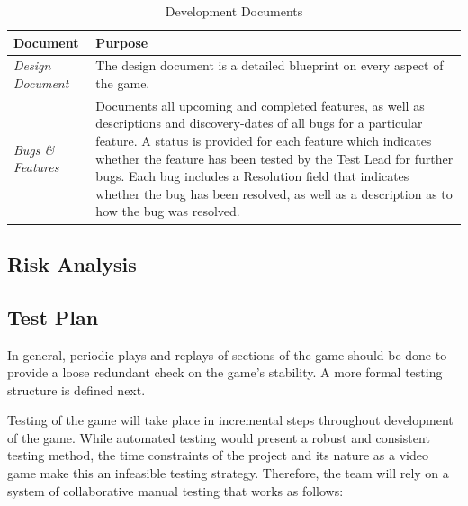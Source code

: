 \documentclass[12pt,titlepage]{article}
\begin{document}
\begin{table}[H]
\centering
\caption{Development Documents}
\label{tab:dev_docs}
\begin{tabularx}{\linewidth}{|l|X|}
\hline
{\bf Document}         & {\bf Purpose} \\ \hline
{\it Design Document}  & The design document is a detailed blueprint on every
                         aspect of the game. \\ \hline
{\it Bugs \& Features} & Documents all upcoming and completed features, as well
                         as descriptions and discovery-dates of all bugs for a
                         particular feature. A status is provided for each
                         feature which indicates whether the feature has been
                         tested by the Test Lead for further bugs. Each bug
                         includes a Resolution field that indicates whether the
                         bug has been resolved, as well as a description as to
                         how the bug was resolved. \\ \hline
\end{tabularx}
\end{table}


\subsection{Risk Analysis}

\subsection{Test Plan}

In general, periodic plays and replays of sections of the game should be done to
provide a loose redundant check on the game's stability. A more formal testing
structure is defined next.

Testing of the game will take place in incremental steps throughout development
of the game. While automated testing would present a robust and consistent
testing method, the time constraints of the project and its nature as a video
game make this an infeasible testing strategy. Therefore, the team will rely on
a system of collaborative manual testing that works as follows:
\end{document}
